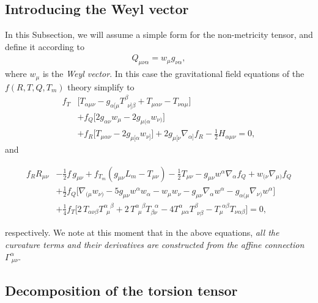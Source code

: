 \documentclass[aps,superscriptaddress, showpacs,preprintnumbers, superscriptaddress, nofootinbibt,twocolumn]{revtex4}
\begin{document}
\subsection{Introducing the  Weyl vector}

In this Subsection, we will assume a simple form for the non-metricity tensor, and define it according to
\begin{align}
Q_{\mu\nu\alpha}=w_\mu g_{\nu\alpha},
\end{align}
where $w_{\mu}$ is the {\it Weyl vector}. In this case the gravitational field equations of the $f\left(R,T,Q,T_m\right)$ theory simplify to
\begin{align}
f_T&\Big[T_{\alpha\mu\nu}-g_{\alpha[\mu}T^\beta_{~~\nu]\beta}+T_{\mu\alpha\nu}-T_{\nu\alpha\mu}\Big]\nonumber\\&+f_Q\Big[2g_{\alpha\nu} w_\mu-2g_{\mu(\alpha}w_{\nu)}\Big]\nonumber\\&+f_R\Big[T_{\mu\alpha\nu}-2g_{\mu[\alpha}w_{\nu]}\Big]+2g_{\mu[\nu}\nabla_{\alpha]}f_R-\frac12H_{\alpha\mu\nu}=0,
\end{align}
and
\begin{widetext}
\begin{align}
f_R R_{\mu\nu}&-\frac12f\,g_{\mu\nu}+f_{T_m}(g_{\mu\nu}L_m-T_{\mu\nu})-\frac12T_{\mu\nu}-g_{\mu\nu}w^\alpha\nabla_\alpha f_Q+w_{(\nu}\nabla_{\mu)}f_Q\nonumber\\&
+\frac12f_Q\Big[\nabla_{(\mu}w_{\nu)}-5g_{\mu\nu}w^\alpha w_\alpha-w_\mu w_\nu-g_{\mu\nu}\nabla_\alpha w^\alpha-g_{\alpha(\mu}\nabla_{\nu)}w^\alpha\Big]
\nonumber\\&+\frac14f_T\Big[2\,T_{\alpha\nu\beta}T^{\alpha~~\beta}_{~~\mu}+2\,T^{\alpha~~\beta}_{~~\mu}T_{\beta\nu}^{~~~\alpha}-4T^\alpha_{~~\mu\alpha}T^\beta_{~~\nu\beta}-T_\mu^{~~\alpha\beta}T_{\nu\alpha\beta}\Big]=0,
\end{align}
\end{widetext}
respectively. We note at this moment that in the above equations, {\it all the curvature terms and their derivatives are constructed from the affine connection $\Gamma^\alpha_{~\mu\nu}$}.

\subsection{Decomposition of the torsion tensor}
\end{document}
